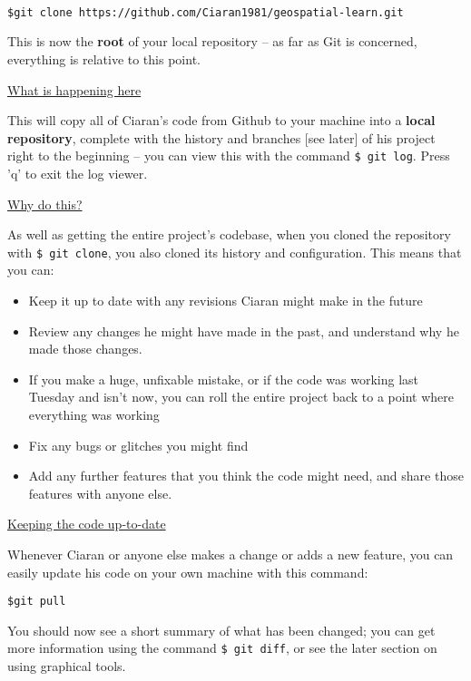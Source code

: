 \documentclass[11pt, a4paper, english]{article}
\begin{document}
\begin{verbatim}

$git clone https://github.com/Ciaran1981/geospatial-learn.git

\end{verbatim}

This is now the \textbf{root} of your local repository -- as far as Git is concerned, everything is relative to this point.


\underline{What is happening here}

This will copy all of Ciaran's code from Github to your machine into a \textbf{local repository}, complete with the history and branches [see later] of his project right to the beginning -- you can view this with the command \verb|$ git log|. Press 'q' to exit the log viewer.

\underline{Why do this?}

As well as getting the entire project's codebase, when you cloned the repository with \verb|$ git clone|, you also cloned its history and configuration. This means that you can:

\begin{itemize}
\item Keep it up to date with any revisions Ciaran might make in the future
\item Review any changes he might have made in the past, and understand why he made those changes.
\item If you make a huge, unfixable mistake, or if the code was working last Tuesday and isn't now, you can roll the entire project back to a point where everything was working
\item Fix any bugs or glitches you might find
\item Add any further features that you think the code might need, and share those features with anyone else.
\end{itemize}

\underline{Keeping the code up-to-date}

Whenever Ciaran or anyone else makes a change or adds a new feature, you can easily update his code on your own machine with this command:

\begin{verbatim}
$git pull
\end{verbatim}

You should now see a short summary of what has been changed; you can get more information using the command \verb|$ git diff|, or see the later section on using graphical tools.
\end{document}
